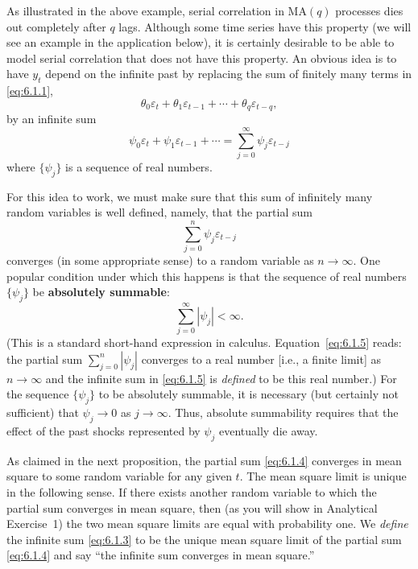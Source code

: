 As illustrated in the above example, serial correlation in $\text{MA}(q)$ processes dies out
completely after $q$ lags. Although some time series have this property (we will see
an example in the application below), it is certainly desirable to be able to model
serial correlation that does not have this property. An obvious idea is to have $y_t$
depend on the infinite past by replacing the sum of finitely many terms in \eqref{eq:6.1.1},
\[
  \theta_0 \varepsilon_t + \theta_1 \varepsilon_{t-1} + \cdots + \theta_q \varepsilon_{t-q},
\]
by an infinite sum
\begin{equation}
  \psi_0 \varepsilon_t + \psi_1 \varepsilon_{t-1} + \cdots
  = \sum_{j=0}^{\infty} \psi_j \varepsilon_{t-j}
  \label{eq:6.1.3}
\end{equation}
where $\{\psi_j\}$ is a sequence of real numbers.

For this idea to work, we must make sure that this sum of infinitely many
random variables is well defined, namely, that the partial sum
\begin{equation}
  \sum_{j=0}^{n} \psi_j \varepsilon_{t-j}
  \label{eq:6.1.4}
\end{equation}
converges (in some appropriate sense) to a random variable as $n \to \infty$. One
popular condition under which this happens is that the sequence of real numbers
$\{\psi_j\}$ be \textbf{absolutely summable}:
\begin{equation}
  \sum_{j=0}^{\infty} |\psi_j| < \infty.
  \label{eq:6.1.5}
\end{equation}
(This is a standard short-hand expression in calculus. Equation~\eqref{eq:6.1.5} reads: the
partial sum $\sum_{j=0}^{n} |\psi_j|$ converges to a real number [i.e., a finite limit] as $n \to \infty$
and the infinite sum in \eqref{eq:6.1.5} is \emph{defined} to be this real number.) For the sequence
$\{\psi_j\}$ to be absolutely summable, it is necessary (but certainly not sufficient) that
$\psi_j \to 0$ as $j \to \infty$. Thus, absolute summability requires that the effect of the past
shocks represented by $\psi_j$ eventually die away.

As claimed in the next proposition, the partial sum \eqref{eq:6.1.4} converges in mean
square to some random variable for any given $t$. The mean square limit is unique
in the following sense. If there exists another random variable to which the partial
sum converges in mean square, then (as you will show in Analytical Exercise~1)
the two mean square limits are equal with probability one. We \emph{define} the infinite
sum \eqref{eq:6.1.3} to be the unique mean square limit of the partial sum \eqref{eq:6.1.4} and say
``the infinite sum converges in mean square.''

